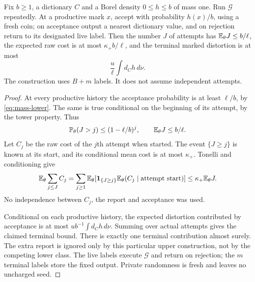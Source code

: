 \begin{lemma}\label{lem:rejection}
Fix $b\ge1$, a dictionary $C$ and a Borel density $0\le h\le b$ of mass one. Run $\mathcal G$ repeatedly. At a productive mark $x$, accept with probability $h(x)/b$, using a fresh coin; on acceptance output a nearest dictionary value, and on rejection return to its designated live label. Then the number $J$ of attempts has $\mathbb E_\theta J\le b/\ell$, the expected raw cost is at most $\kappa_+b/\ell$, and the terminal marked distortion is at most
\[
 \frac u\ell\int d_C h\,d\nu.
\]
The construction uses $B+m$ labels. It does not assume independent attempts.
\end{lemma}
\begin{proof}
At every productive history the acceptance probability is at least $\ell/b$, by \eqref{eq:mass-lower}. The same is true conditional on the beginning of its attempt, by the tower property. Thus
\[
 \mathbb P_\theta(J>j)\le(1-\ell/b)^j,
 \qquad \mathbb E_\theta J\le b/\ell.
\]
Let $C_j$ be the raw cost of the $j$th attempt when started. The event $\{J\ge j\}$ is known at its start, and its conditional mean cost is at most $\kappa_+$. Tonelli and conditioning give
\[
 \mathbb E_\theta\sum_{j\le J}C_j
 =\sum_{j\ge1}\mathbb E_\theta[\mathbf1_{\{J\ge j\}}\mathbb E_\theta(C_j\mid\text{attempt start})]
 \le\kappa_+\mathbb E_\theta J.
\]
No independence between $C_j$, the report and acceptance was used.

Conditional on each productive history, the expected distortion contributed by acceptance is at most $u b^{-1}\int d_C h\,d\nu$. Summing over actual attempts gives the claimed terminal bound. There is exactly one terminal contribution almost surely. The extra report is ignored only by this particular upper construction, not by the competing lower class. The live labels execute $\mathcal G$ and return on rejection; the $m$ terminal labels store the fixed output. Private randomness is fresh and leaves no uncharged seed.
\end{proof}

